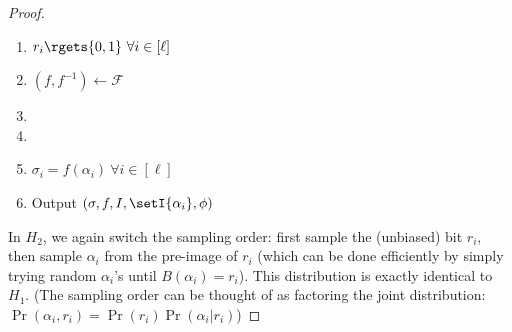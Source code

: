 \begin{proof}
\begin{enumerate}
    \item $r_i \rgets \{0, 1\} ~\forall i \in [\ell]$
    \item $(f, f^{-1}) \gets \mathcal{F}$
    \item {}
    \item {}
    \item $\sigma_i = f(\alpha_i) ~\forall i \in [\ell]$
    \item Output $(\sigma, f, I, \setI{\alpha_i}, \phi)$
\end{enumerate}
In $H_2$, we again switch the sampling order: first sample the (unbiased) bit
$r_i$, then sample $\alpha_i$ from the pre-image of $r_i$ (which can be done efficiently
by simply trying random $\alpha_i$'s until $B(\alpha_i) = r_i$).
This distribution is exactly identical to $H_1$.
(The sampling order can be thought of as factoring the joint distribution:
$\Pr(\alpha_i, r_i) = \Pr(r_i)\Pr(\alpha_i | r_i)$)


\end{proof}
